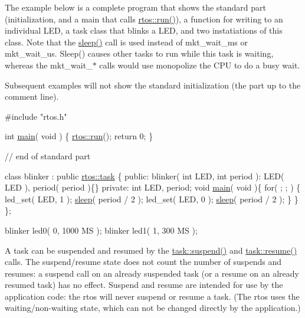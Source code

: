 The example below is a complete program that shows the standard part (initialization, and a main that calls \hyperlink{classrtos_a1b1490e971b7908f28f7af9cfb18e5aa}{rtos\+::run()}), a function for writing to an individual L\+ED, a task class that blinks a L\+ED, and two instatiations of this class. Note that the \hyperlink{classrtos_1_1task__base_a1110fdfe776e7f256eb809216e97c836}{sleep()} call is used instead of mkt\+\_\+wait\+\_\+ms or mkt\+\_\+wait\+\_\+us. Sleep() causes other tasks to run while this task is waiting, whereas the mkt\+\_\+wait\+\_\+$\ast$ calls would use monopolize the C\+PU to do a busy wait.

Subsequent examples will not show the standard initialization (the part up to the comment line).


\begin{DoxyCode}
\textcolor{preprocessor}{#include "rtos.h"}

\textcolor{keywordtype}{int} \hyperlink{classrtos_1_1task__base_a35016dfecdd20ce4786ef7a16154976a}{main}( \textcolor{keywordtype}{void} ) \{
   \hyperlink{classrtos_a1b1490e971b7908f28f7af9cfb18e5aa}{rtos::run}();
   \textcolor{keywordflow}{return} 0;
\}

\textcolor{comment}{// end of standard part}

\textcolor{keyword}{class }blinker : \textcolor{keyword}{public} \hyperlink{classrtos_1_1task}{rtos::task} \{
\textcolor{keyword}{public}:
   blinker( \textcolor{keywordtype}{int} LED, \textcolor{keywordtype}{int} period ):
      LED( LED ), period( period )\{\}
\textcolor{keyword}{private}:
   \textcolor{keywordtype}{int} LED, period;
   \textcolor{keywordtype}{void} \hyperlink{classrtos_1_1task__base_a35016dfecdd20ce4786ef7a16154976a}{main}( \textcolor{keywordtype}{void} )\{
      \textcolor{keywordflow}{for}( ; ; ) \{
         led\_set( LED, 1 );
         \hyperlink{classrtos_1_1task__base_a1110fdfe776e7f256eb809216e97c836}{sleep}( period / 2 );
         led\_set( LED, 0 );
         \hyperlink{classrtos_1_1task__base_a1110fdfe776e7f256eb809216e97c836}{sleep}( period / 2 );
      \}
   \}
\};

blinker led0( 0, 1000 MS );
blinker led1( 1,  300 MS );
\end{DoxyCode}


A task can be suspended and resumed by the \hyperlink{classrtos_1_1task__base_a2e5c57f7993ffa43c91348277ec2478c}{task\+::suspend()} and \hyperlink{classrtos_1_1task__base_a4e9601dcea7c1d392b05ebd4f921de04}{task\+::resume()} calls. The suspend/resume state does not count the number of suspends and resumes\+: a suspend call on an already suspended task (or a resume on an already resumed task) has no effect. Suspend and resume are intended for use by the application code\+: the rtos will never suspend or resume a task. (The rtos uses the waiting/non-\/waiting state, which can not be changed directly by the application.)

